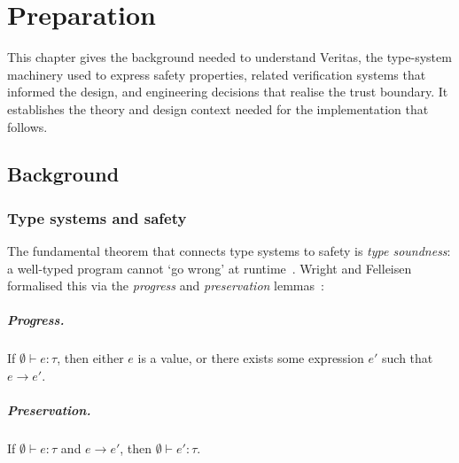 
\chapter{Preparation}\label{ch:prep}

This chapter gives the background needed to understand Veritas, the type-system machinery used to express safety properties, related verification systems that informed the design, and engineering decisions that realise the trust boundary. It establishes the theory and design context needed for the implementation that follows.

\section{Background}\label{sec:background}

\subsection{Type systems and safety}

The fundamental theorem that connects type systems to safety is \emph{type soundness}: a well-typed program cannot `go wrong' at runtime~\cite{Milner1978Theory}. Wright and Felleisen formalised this via the \emph{progress} and \emph{preservation} lemmas~\cite{Wright1994Syntactic}:

\begin{tcolorbox}[colback=blue!5!white,colframe=blue!75!black]
  \paragraph{Progress.} If $\emptyset \vdash e : \tau$, then either $e$ is a value, or there exists some expression $e'$ such that $e \to e'$. \\

  \paragraph{Preservation.} If $\emptyset \vdash e : \tau$ and $e \to e'$, then $\emptyset \vdash e' : \tau$.
\end{tcolorbox}

%

